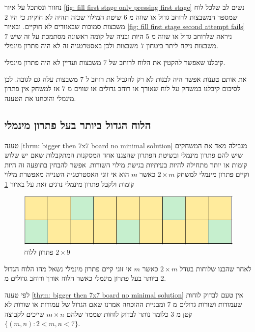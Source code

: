 \documentclass[12pt,leqno]{article}
\theoremstyle{theoremdd}
\begin{document}
נחזור ונסתכל על איור 
\ref{fig: fill first stage only pressing first stage}
נשים לב שלכל לוח שמספר המשבצות לרוחב גדול או שווה 
מ
$6$
שיטת המילוי שכזה תהיה לא חוקית כי היו 
$2$
משבצות סמוכות שבאזורים לא חוקיים.
ובאיור 
\ref{fig: fill first stage second attempt fails}
ניראה
שלרוחב גדול או שווה 
מ
$5$
היות ובניה
של קומה ראשונה מסתמכת על זה שיש 
$7$
משבצות ניקח ליתר ביטחון 
$7$
משבצות ולכן באסטרטגיה זה לא היה פתרון מינמלי.

קיבלנו שאפשר להקטין את הלוח לרוחב של
$7$
משבצות 
ועדיין לא היה פתרון  מינמלי. 

את אותם טענות אפשר היה לבנות לא רק להגביל את רוחב ל
$7$
משבצות עלה גם לגובה.
לכן לסיכום קיבלנו 
במשחק על לוח 
שאורך או רוחב גדולים או שווים מ
$7$
אז
למשחק אין פתרון מינמלי
והוכחנו את הטענה.


\subsection{הלוח הגדול ביותר בעל פתרון מינמלי}
טענה 
\ref{thrm: bigger then 7x7 board no minimal solution} 
מגבילה מאד את המשחקים שיש להם פתרון מינמלי ובשיטת הפתרון שהצגנו
אחד המסקנות המתקבלות שאם יש שלוש קומות או יותר מתחילה
להיות בעיתיות בגישת מילוי השורות.
אפשר להבחין בתופעה זה היות וקיים פתרון מינמלי למשחק 
$2 \times m$
כאשר 
$m$
הוא אי זוגי
האסטרטגיה השנייה מאפשרת מילוי קומות ולקבל פתרון מינמלי
נדגים זאת על באיור 
\ref{fig: 2x9 have min sol}

\begin{figure}[ht]
    \caption{פתרון ללוח 
    $2 \times 9$}
    \label{fig: 2x9 have min sol}
    \centering
    \includegraphics[width=.7\textwidth,height=.7\textheight,keepaspectratio]{images/2xm_sol.PNG}
\end{figure}

לאחר שהבנו שלוחות בגודל 
$2 \times m$
כאשר 
$m$
אי זוגי 
קיים פתרון מינמלי נשאל מהו הלוח 
הגדול ביותר
בעל פתרון מינמלי כאשר 
הלוח אורך ורוחב גדולים מ
$2$.

לפי טענה 
\ref{thrm: bigger then 7x7 board no minimal solution} 
אין טעם לבדוק לוחות שעמודות ושורות גדולים מ
$7$
ומבניית ההוכחה 
אמרנו שאם 
הגדול של עמודות או שורות לא קטן
מ
$3$
כלומר נותר לבדוק לוחות שממד שלהם 
$m \times n$
שייכים לקבוצה
$\{ (m,n) : 2 < m,n <7 \}$.
\end{document}
